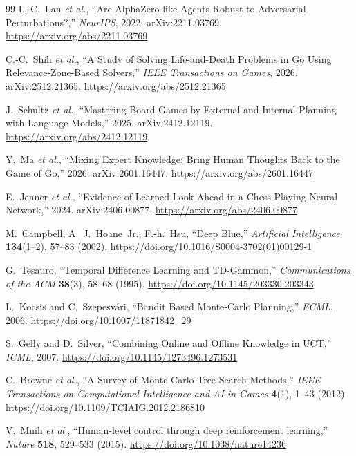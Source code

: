 \documentclass[11pt]{article}
\begin{document}
\begin{thebibliography}{99}
 L.-C.~Lan \emph{et al.},
  ``Are AlphaZero-like Agents Robust to Adversarial Perturbations?,''
  \emph{NeurIPS}, 2022. arXiv:2211.03769. \url{https://arxiv.org/abs/2211.03769}

 C.-C.~Shih \emph{et al.},
  ``A Study of Solving Life-and-Death Problems in Go Using Relevance-Zone-Based Solvers,''
  \emph{IEEE Transactions on Games}, 2026. arXiv:2512.21365.
  \url{https://arxiv.org/abs/2512.21365}

 J.~Schultz \emph{et al.},
  ``Mastering Board Games by External and Internal Planning with Language Models,'' 2025.
  arXiv:2412.12119. \url{https://arxiv.org/abs/2412.12119}

 Y.~Ma \emph{et al.},
  ``Mixing Expert Knowledge: Bring Human Thoughts Back to the Game of Go,'' 2026.
  arXiv:2601.16447. \url{https://arxiv.org/abs/2601.16447}

 E.~Jenner \emph{et al.},
  ``Evidence of Learned Look-Ahead in a Chess-Playing Neural Network,'' 2024.
  arXiv:2406.00877. \url{https://arxiv.org/abs/2406.00877}

 M.~Campbell, A.~J.~Hoane~Jr., F.-h.~Hsu,
  ``Deep Blue,'' \emph{Artificial Intelligence} \textbf{134}(1--2), 57--83 (2002).
  \url{https://doi.org/10.1016/S0004-3702(01)00129-1}

 G.~Tesauro,
  ``Temporal Difference Learning and TD-Gammon,''
  \emph{Communications of the ACM} \textbf{38}(3), 58--68 (1995).
  \url{https://doi.org/10.1145/203330.203343}

 L.~Kocsis and C.~Szepesv\'ari,
  ``Bandit Based Monte-Carlo Planning,'' \emph{ECML}, 2006.
  \url{https://doi.org/10.1007/11871842_29}

 S.~Gelly and D.~Silver,
  ``Combining Online and Offline Knowledge in UCT,'' \emph{ICML}, 2007.
  \url{https://doi.org/10.1145/1273496.1273531}

 C.~Browne \emph{et al.},
  ``A Survey of Monte Carlo Tree Search Methods,''
  \emph{IEEE Transactions on Computational Intelligence and AI in Games} \textbf{4}(1),
  1--43 (2012). \url{https://doi.org/10.1109/TCIAIG.2012.2186810}

 V.~Mnih \emph{et al.},
  ``Human-level control through deep reinforcement learning,''
  \emph{Nature} \textbf{518}, 529--533 (2015).
  \url{https://doi.org/10.1038/nature14236}


\end{thebibliography}
\end{document}
